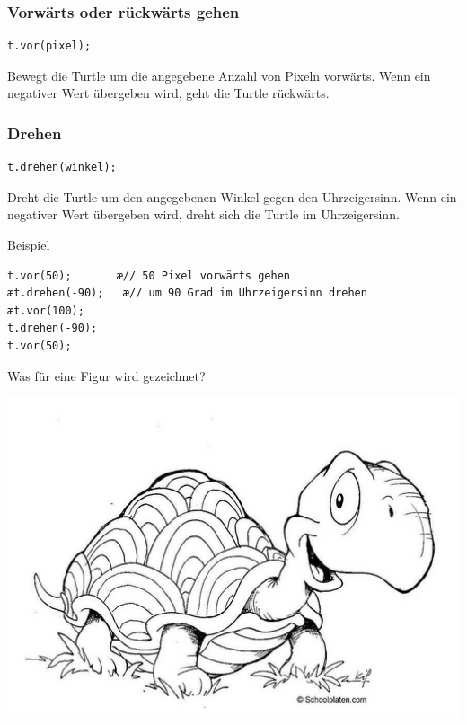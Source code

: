 \subsubsection{Vorwärts oder rückwärts gehen}

\begin{lstlisting}
t.vor(pixel);
\end{lstlisting}

Bewegt die Turtle um die angegebene Anzahl von Pixeln vorwärts. Wenn ein negativer Wert übergeben
wird, geht die Turtle rückwärts.

\subsubsection{Drehen}

\begin{lstlisting}
t.drehen(winkel);
\end{lstlisting}

Dreht die Turtle um den angegebenen Winkel gegen den Uhrzeigersinn. Wenn ein
negativer Wert übergeben wird, dreht sich die Turtle im Uhrzeigersinn.

\begin{minipage}{0.70\textwidth}
Beispiel

\begin{lstlisting}
t.vor(50);       æ// 50 Pixel vorwärts gehen
æt.drehen(-90);   æ// um 90 Grad im Uhrzeigersinn drehen
æt.vor(100);
t.drehen(-90);
t.vor(50);
\end{lstlisting}

Was für eine Figur wird gezeichnet?
\end{minipage}\hfill
\begin{minipage}{0.30\textwidth}
\includegraphics[width=1.0\textwidth]{./inf/SEKII/05_Java_TurtleGrafik/schildkroete.jpg}
\end{minipage}

